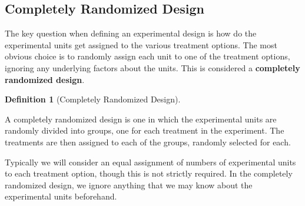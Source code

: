 \documentclass[
  letterpaper,
  DIV=11,
  numbers=noendperiod]{scrreprt}
\theoremstyle{definition}
\theoremstyle{definition}
\theoremstyle{definition}
\newtheorem{definition}{Definition}[chapter]
\theoremstyle{remark}
\begin{document}
\subsection{Completely Randomized
Design}\label{completely-randomized-design}

The key question when defining an experimental design is how do the
experimental units get assigned to the various treatment options. The
most obvious choice is to randomly assign each unit to one of the
treatment options, ignoring any underlying factors about the units. This
is considered a \textbf{completely randomized design}.

\begin{definition}[Completely Randomized
Design]\protect\hypertarget{def-completely-randomized-design}{}\label{def-completely-randomized-design}

A completely randomized design is one in which the experimental units
are randomly divided into groups, one for each treatment in the
experiment. The treatments are then assigned to each of the groups,
randomly selected for each.

\end{definition}

Typically we will consider an equal assignment of numbers of
experimental units to each treatment option, though this is not strictly
required. In the completely randomized design, we ignore anything that
we may know about the experimental units beforehand.
\end{document}
